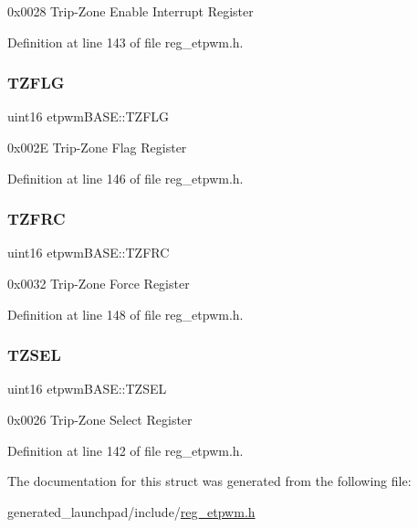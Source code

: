 0x0028 Trip-\/\+Zone Enable Interrupt Register 

Definition at line 143 of file reg\+\_\+etpwm.\+h.

\mbox{\label{structetpwmBASE_a5340173a2069e4e74a2c6099109284b3}} 
\subsubsection{\texorpdfstring{T\+Z\+F\+LG}{TZFLG}}
{\footnotesize\ttfamily uint16 etpwm\+B\+A\+S\+E\+::\+T\+Z\+F\+LG}

0x002E Trip-\/\+Zone Flag Register 

Definition at line 146 of file reg\+\_\+etpwm.\+h.

\mbox{\label{structetpwmBASE_a908e972df9bd8c2627974f1fe687e68a}} 
\subsubsection{\texorpdfstring{T\+Z\+F\+RC}{TZFRC}}
{\footnotesize\ttfamily uint16 etpwm\+B\+A\+S\+E\+::\+T\+Z\+F\+RC}

0x0032 Trip-\/\+Zone Force Register 

Definition at line 148 of file reg\+\_\+etpwm.\+h.

\mbox{\label{structetpwmBASE_a16ba0292c3192482468b4a173668b02a}} 
\subsubsection{\texorpdfstring{T\+Z\+S\+EL}{TZSEL}}
{\footnotesize\ttfamily uint16 etpwm\+B\+A\+S\+E\+::\+T\+Z\+S\+EL}

0x0026 Trip-\/\+Zone Select Register 

Definition at line 142 of file reg\+\_\+etpwm.\+h.



The documentation for this struct was generated from the following file\+:\begin{DoxyCompactItemize}
\item 
generated\+\_\+launchpad/include/\mbox{\hyperlink{reg__etpwm_8h}{reg\+\_\+etpwm.\+h}}\end{DoxyCompactItemize}
